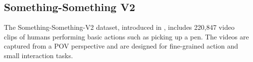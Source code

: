 \subsection*{Something-Something V2}
The Something-Something-V2 dataset, introduced in \cite{something-something-dataset}, includes 220,847 video clips of humans performing basic actions such as picking up a pen. The videos are captured from a POV perspective and are designed for fine-grained action and small interaction tasks.